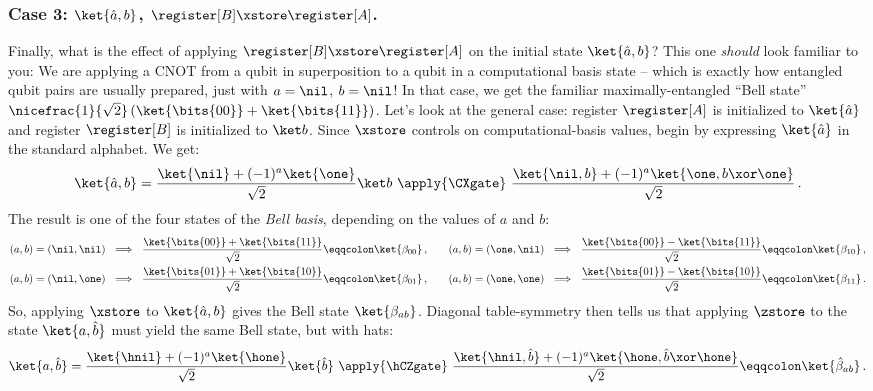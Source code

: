     \subsubsection{Case 3: $\ket{\hat a, b}$, $\register[B] \xstore \register[A]$.}
      Finally, what is the effect of applying $\register[B] \xstore
        \register[A]$ on the initial state $\ket{\hat a, b}$? 
        This one \emph{should} look familiar to you: We
        are applying a CNOT from a qubit in superposition to a qubit in a
        computational basis state -- which is exactly how entangled qubit pairs are
        usually prepared, just with $a=\nil$, $b=\nil$!
        In that case, we get the familiar maximally-entangled ``Bell state'' 
        $\nicefrac{1}{\sqrt 2}\, (\ket{\bits{00}} + \ket{\bits{11}})$.
        Let's look at the general case:
        register $\register[A]$ is initialized to $\ket{\hat a}$ and register
        $\register[B]$ is initialized to $\ket b$. Since $\xstore$ controls on
        computational-basis values, begin by expressing $\ket{\hat a}$ in the
        standard alphabet. We get:
        \[
          \ket{\hat a, b} 
            = \frac{\ket{\nil} + (-1)^a \ket{\one}}{\sqrt 2}\ket b\ 
            \apply{\CXgate}\ \frac{\ket{\nil, b} + (-1)^a \ket{\one, b \xor \one}}{\sqrt 2}\, .
        \]
        The result is one of the four states  of the \emph{Bell basis}, 
          depending on the values of $a$ and $b$:
        \begin{align*}
          (a,b) = (\nil,\nil)\ \implies\ \frac{\ket{\bits{00}} + \ket{\bits{11}}}{\sqrt 2} \eqqcolon \ket{\beta_{00}}\, ,
          &\qquad
          (a,b) = (\one,\nil)\ \implies\ \frac{\ket{\bits{00}} - \ket{\bits{11}}}{\sqrt 2} \eqqcolon \ket{\beta_{10}}\, , 
          \\
          (a,b) = (\nil,\one)\ \implies\ \frac{\ket{\bits{01}} + \ket{\bits{10}}}{\sqrt 2} \eqqcolon \ket{\beta_{01}}\, ,
          &\qquad
          (a,b) = (\one,\one)\ \implies\ \frac{\ket{\bits{01}} - \ket{\bits{10}}}{\sqrt 2} \eqqcolon \ket{\beta_{11}}\, .
        \end{align*}
      So, applying $\xstore$ to $\ket{\hat a, b}$ gives the Bell state
        $\ket{\beta_{ab}}$. Diagonal table-symmetry then tells us that applying
        $\zstore$ to the state $\ket{a, \hat b}$
        must yield the same Bell state, but with hats:
        \[
          \ket{a, \hat b} 
            = \frac{\ket{\hnil} + (-1)^a \ket{\hone}}{\sqrt 2}\ket{\hat b}\ 
            \apply{\hCZgate}\ \frac{\ket{\hnil, \hat b} + (-1)^a \ket{\hone, \hat b \xor \hone}}{\sqrt 2}
            \eqqcolon \ket{\hat{\beta}_{ab}}\, .
        \]
